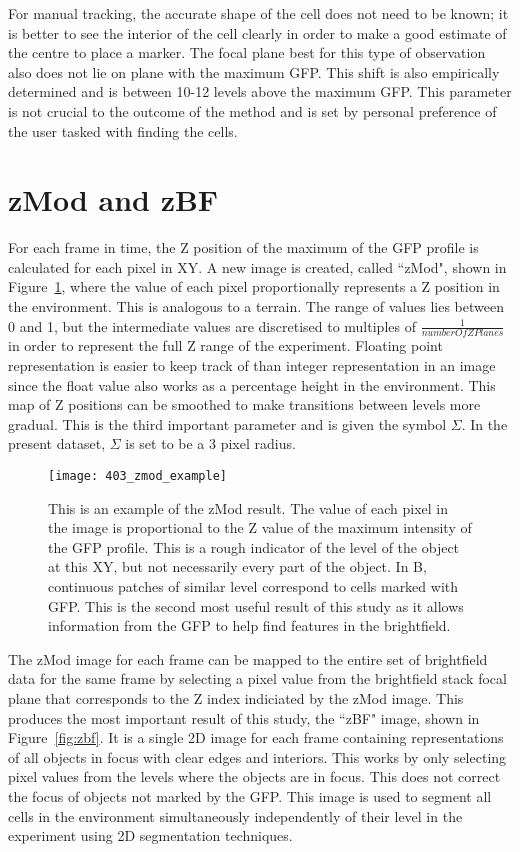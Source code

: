 For manual tracking, the accurate shape of the cell does not need to be known; it is better to see the interior of the cell clearly in order to make a good estimate of the centre to place a marker. The focal plane best for this type of observation also does not lie on plane with the maximum GFP. This shift is also empirically determined and is between 10-12 levels above the maximum GFP. This parameter is not crucial to the outcome of the method and is set by personal preference of the user tasked with finding the cells.

\section{zMod and zBF}

For each frame in time, the Z position of the maximum of the GFP profile is calculated for each pixel in XY. A new image is created, called ``zMod", shown in Figure~\ref{fig:zmodexample}, where the value of each pixel proportionally represents a Z position in the environment. This is analogous to a terrain. The range of values lies between 0 and 1, but the intermediate values are discretised to multiples of $\frac{1}{numberOfZPlanes}$ in order to represent the full Z range of the experiment. Floating point representation is easier to keep track of than integer representation in an image since the float value also works as a percentage height in the environment. This map of Z positions can be smoothed to make transitions between levels more gradual. This is the third important parameter and is given the symbol $\Sigma$. In the present dataset, $\Sigma$ is set to be a 3 pixel radius.

\begin{figure}[h!]
 \centering
 \texttt{[image: 403\_zmod\_example]}
 \caption[zMod example]{
 	This is an example of the zMod result. The value of each pixel in the image is proportional to the Z value of the maximum intensity of the GFP profile. This is a rough indicator of the level of the object at this XY, but not necessarily every part of the object. In B, continuous patches of similar level correspond to cells marked with GFP. This is the second most useful result of this study as it allows information from the GFP to help find features in the brightfield.
 }
 \label{fig:zmodexample}
\end{figure}

The zMod image for each frame can be mapped to the entire set of brightfield data for the same frame by selecting a pixel value from the brightfield stack focal plane that corresponds to the Z index indiciated by the zMod image. This produces the most important result of this study, the ``zBF" image, shown in Figure~\ref{fig:zbf}. It is a single 2D image for each frame containing representations of all objects in focus with clear edges and interiors. This works by only selecting pixel values from the levels where the objects are in focus. This does not correct the focus of objects not marked by the GFP. This image is used to segment all cells in the environment simultaneously independently of their level in the experiment using 2D segmentation techniques.

